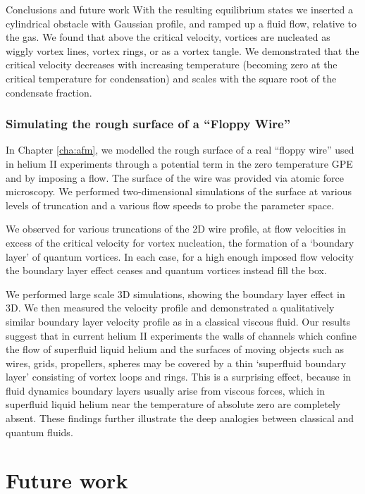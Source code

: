 \begin{chapter}{\label{cha:conc}Conclusions and future work}
With the resulting equilibrium states we inserted a cylindrical obstacle with Gaussian profile, and ramped up a fluid flow, relative to the gas.  We found that above the critical velocity, vortices are nucleated as wiggly vortex lines, vortex rings, or as a vortex tangle. We demonstrated that the critical velocity decreases with increasing temperature (becoming zero at the critical temperature for condensation) and scales with the square root of the condensate fraction.

\subsubsection{Simulating the rough surface of a ``Floppy Wire''}
In Chapter \ref{cha:afm}, we modelled the rough surface of a real ``floppy wire'' used in helium II experiments through a potential term in the zero temperature GPE and by imposing a flow. The surface of the wire was provided via atomic force microscopy. We performed two-dimensional simulations of the surface at various levels of truncation and a various flow speeds to probe the parameter space.

We observed for various truncations of the 2D wire profile, at flow velocities in excess of the critical velocity for vortex nucleation, the formation of a `boundary layer' of quantum vortices. In each case, for a high enough imposed flow velocity the boundary layer effect ceases and quantum vortices instead fill the box.

We performed large scale 3D simulations, showing the boundary layer effect in 3D. We then measured the velocity profile and demonstrated a qualitatively similar boundary layer velocity profile as in a classical viscous fluid.  Our results suggest that in current helium II experiments the walls of channels which confine the flow of superfluid liquid helium and the surfaces of moving objects such as wires, grids, propellers, spheres may be covered by a thin `superfluid boundary layer' consisting of vortex loops and rings. This is a surprising effect, because in fluid dynamics boundary layers usually arise from viscous forces, 
which in superfluid liquid helium near the temperature of
absolute zero are completely absent.  These findings further illustrate the deep analogies between classical and quantum fluids.

\section{Future work} 

\end{chapter}
